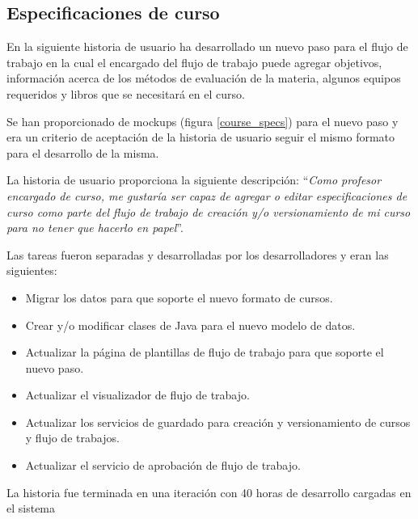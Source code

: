 \subsection{Especificaciones de curso}
En la siguiente historia de usuario ha desarrollado un nuevo paso para el flujo de trabajo en la cual el encargado del flujo de trabajo puede agregar objetivos, información acerca de los métodos de evaluación de la materia, algunos equipos requeridos y libros que se necesitará en el curso.

Se han proporcionado de mockups (figura \ref{course_specs}) para el nuevo paso y era un criterio de aceptación de la historia de usuario seguir el mismo formato para el desarrollo de la misma.

La historia de usuario proporciona la siguiente descripción: \enquote{\textit{Como profesor encargado de curso, me gustaría ser capaz de agregar o editar especificaciones de curso como parte del flujo de trabajo de creación y/o versionamiento de mi curso para no tener que hacerlo en papel}}.

Las tareas fueron separadas y desarrolladas por los desarrolladores y eran las siguientes:
\begin{itemize}
	\item Migrar los datos para que soporte el nuevo formato de cursos.
	\item Crear y/o modificar clases de Java para el nuevo modelo de datos.
	\item Actualizar la página de plantillas de flujo de trabajo para que soporte el nuevo paso.
	\item Actualizar el visualizador de flujo de trabajo.
	\item Actualizar los servicios de guardado para creación y versionamiento de cursos y flujo de trabajos.
	\item Actualizar el servicio de aprobación de flujo de trabajo.
\end{itemize}

La historia fue terminada en una iteración con 40 horas de desarrollo cargadas en el sistema

